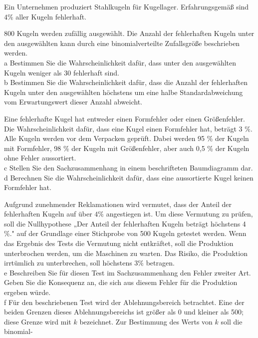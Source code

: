 \documentclass[10pt]{article}
\begin{document}
Ein Unternehmen produziert Stahlkugeln für Kugellager. Erfahrungsgemäß sind $4 \%$ aller Kugeln fehlerhaft.

800 Kugeln werden zufällig ausgewählt. Die Anzahl der fehlerhaften Kugeln unter den ausgewählten kann durch eine binomialverteilte Zufallsgröße beschrieben werden.\\
a Bestimmen Sie die Wahrscheinlichkeit dafür, dass unter den ausgewählten Kugeln weniger als 30 fehlerhaft sind.\\
b Bestimmen Sie die Wahrscheinlichkeit dafür, dass die Anzahl der fehlerhaften Kugeln unter den ausgewählten höchstens um eine halbe Standardabweichung vom Erwartungswert dieser Anzahl abweicht.

Eine fehlerhafte Kugel hat entweder einen Formfehler oder einen Größenfehler. Die Wahrscheinlichkeit dafür, dass eine Kugel einen Formfehler hat, beträgt 3 \%. Alle Kugeln werden vor dem Verpacken geprüft. Dabei werden 95 \% der Kugeln mit Formfehler, 98 \% der Kugeln mit Größenfehler, aber auch 0,5 \% der Kugeln ohne Fehler aussortiert.\\
c Stellen Sie den Sachzusammenhang in einem beschrifteten Baumdiagramm dar.\\
d Berechnen Sie die Wahrscheinlichkeit dafür, dass eine aussortierte Kugel keinen Formfehler hat.

Aufgrund zunehmender Reklamationen wird vermutet, dass der Anteil der fehlerhaften Kugeln auf über $4 \%$ angestiegen ist. Um diese Vermutung zu prüfen, soll die Nullhypothese „Der Anteil der fehlerhaften Kugeln beträgt höchstens 4 \%." auf der Grundlage einer Stichprobe von 500 Kugeln getestet werden. Wenn das Ergebnis des Tests die Vermutung nicht entkräftet, soll die Produktion unterbrochen werden, um die Maschinen zu warten. Das Risiko, die Produktion irrtümlich zu unterbrechen, soll höchstens $3 \%$ betragen.\\
e Beschreiben Sie für diesen Test im Sachzusammenhang den Fehler zweiter Art. Geben Sie die Konsequenz an, die sich aus diesem Fehler für die Produktion ergeben würde.\\
f Für den beschriebenen Test wird der Ablehnungsbereich betrachtet. Eine der beiden Grenzen dieses Ablehnungsbereichs ist größer als 0 und kleiner als 500; diese Grenze wird mit $k$ bezeichnet. Zur Bestimmung des Werts von $k$ soll die binomial-
\end{document}
